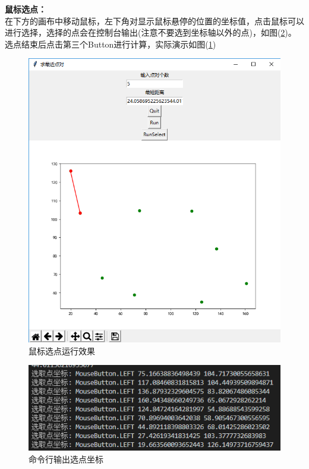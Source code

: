 \documentclass[UTF8]{ctexart}
\begin{document}
\textbf{鼠标选点：}\\
在下方的画布中移动鼠标，左下角对显示鼠标悬停的位置的坐标值，点击鼠标可以进行选择，选择的点会在控制台输出(注意不要选到坐标轴以外的点)，如图(\ref{img1-6})。选点结束后点击第三个Button进行计算，实际演示如图(\ref{img1-5})

\begin{figure}[H]
    \centering
    \includegraphics[width=1\textwidth]{img/1-5.png}
    \caption{鼠标选点运行效果}
    \label{img1-5}
\end{figure}

\begin{figure}[H]
    \centering
    \includegraphics[width=1\textwidth]{img/1-6.png}
    \caption{命令行输出选点坐标}
    \label{img1-6}
\end{figure}
\end{document}
